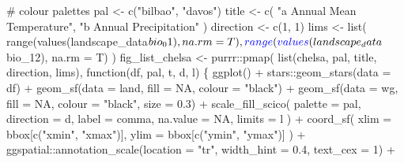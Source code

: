\documentclass[]{article}
\newenvironment{Shaded}{}{}
\newcommand{\CommentTok}[1]{\textcolor[rgb]{0.00,0.50,0.00}{#1}}
\newcommand{\ControlFlowTok}[1]{\textcolor[rgb]{0.00,0.00,1.00}{#1}}
\newcommand{\DataTypeTok}[1]{#1}
\newcommand{\DecValTok}[1]{#1}
\newcommand{\FloatTok}[1]{#1}
\newcommand{\KeywordTok}[1]{\textcolor[rgb]{0.00,0.00,1.00}{#1}}
\newcommand{\NormalTok}[1]{#1}
\newcommand{\OperatorTok}[1]{#1}
\newcommand{\OtherTok}[1]{\textcolor[rgb]{1.00,0.25,0.00}{#1}}
\newcommand{\StringTok}[1]{\textcolor[rgb]{0.00,0.50,0.50}{#1}}
\begin{document}
\begin{Shaded}
\begin{Highlighting}[numbers=left,,]
{\CommentTok{# colour palettes}
\NormalTok{pal <-}\StringTok{ }\KeywordTok{c}\NormalTok{(}\StringTok{"bilbao"}\NormalTok{, }\StringTok{"davos"}\NormalTok{)}
\NormalTok{title <-}\StringTok{ }\KeywordTok{c}\NormalTok{(}
  \StringTok{"a Annual Mean Temperature"}\NormalTok{,}
  \StringTok{"b Annual Precipitation"}
\NormalTok{)}
\NormalTok{direction <-}\StringTok{ }\KeywordTok{c}\NormalTok{(}\DecValTok{1}\NormalTok{, }\DecValTok{1}\NormalTok{)}
\NormalTok{lims <-}\StringTok{ }\KeywordTok{list}\NormalTok{(}
  \KeywordTok{range}\NormalTok{(}\KeywordTok{values}\NormalTok{(landscape_data}\OperatorTok{$}\NormalTok{bio_}\DecValTok{01}\NormalTok{), }\DataTypeTok{na.rm =}\NormalTok{ T),}
  \KeywordTok{range}\NormalTok{(}\KeywordTok{values}\NormalTok{(landscape_data}\OperatorTok{$}\NormalTok{bio_}\DecValTok{12}\NormalTok{), }\DataTypeTok{na.rm =}\NormalTok{ T)}
\NormalTok{)}
\NormalTok{fig_list_chelsa <-}
\StringTok{  }\NormalTok{purrr}\OperatorTok{::}\KeywordTok{pmap}\NormalTok{(}
    \KeywordTok{list}\NormalTok{(chelsa, pal, title, direction, lims),}
    \ControlFlowTok{function}\NormalTok{(df, pal, t, d, l) \{}
      \KeywordTok{ggplot}\NormalTok{() }\OperatorTok{+}
\StringTok{        }\NormalTok{stars}\OperatorTok{::}\KeywordTok{geom_stars}\NormalTok{(}\DataTypeTok{data =}\NormalTok{ df) }\OperatorTok{+}
\StringTok{        }\KeywordTok{geom_sf}\NormalTok{(}\DataTypeTok{data =}\NormalTok{ land, }\DataTypeTok{fill =} \OtherTok{NA}\NormalTok{, }\DataTypeTok{colour =} \StringTok{"black"}\NormalTok{) }\OperatorTok{+}
\StringTok{        }\KeywordTok{geom_sf}\NormalTok{(}\DataTypeTok{data =}\NormalTok{ wg, }\DataTypeTok{fill =} \OtherTok{NA}\NormalTok{, }\DataTypeTok{colour =} \StringTok{"black"}\NormalTok{, }\DataTypeTok{size =} \FloatTok{0.3}\NormalTok{) }\OperatorTok{+}
\StringTok{        }\KeywordTok{scale_fill_scico}\NormalTok{(}
          \DataTypeTok{palette =}\NormalTok{ pal, }\DataTypeTok{direction =}\NormalTok{ d,}
          \DataTypeTok{label =}\NormalTok{ comma, }\DataTypeTok{na.value =} \OtherTok{NA}\NormalTok{, }\DataTypeTok{limits =}\NormalTok{ l}
\NormalTok{        ) }\OperatorTok{+}
\StringTok{        }\KeywordTok{coord_sf}\NormalTok{(}
          \DataTypeTok{xlim =}\NormalTok{ bbox[}\KeywordTok{c}\NormalTok{(}\StringTok{"xmin"}\NormalTok{, }\StringTok{"xmax"}\NormalTok{)],}
          \DataTypeTok{ylim =}\NormalTok{ bbox[}\KeywordTok{c}\NormalTok{(}\StringTok{"ymin"}\NormalTok{, }\StringTok{"ymax"}\NormalTok{)]}
\NormalTok{        ) }\OperatorTok{+}
\StringTok{        }\NormalTok{ggspatial}\OperatorTok{::}\KeywordTok{annotation_scale}\NormalTok{(}\DataTypeTok{location =} \StringTok{"tr"}\NormalTok{, }\DataTypeTok{width_hint =} \FloatTok{0.4}\NormalTok{, }\DataTypeTok{text_cex =} \DecValTok{1}\NormalTok{) }\OperatorTok{+}
}
\end{Highlighting}
\end{Shaded}
\end{document}
